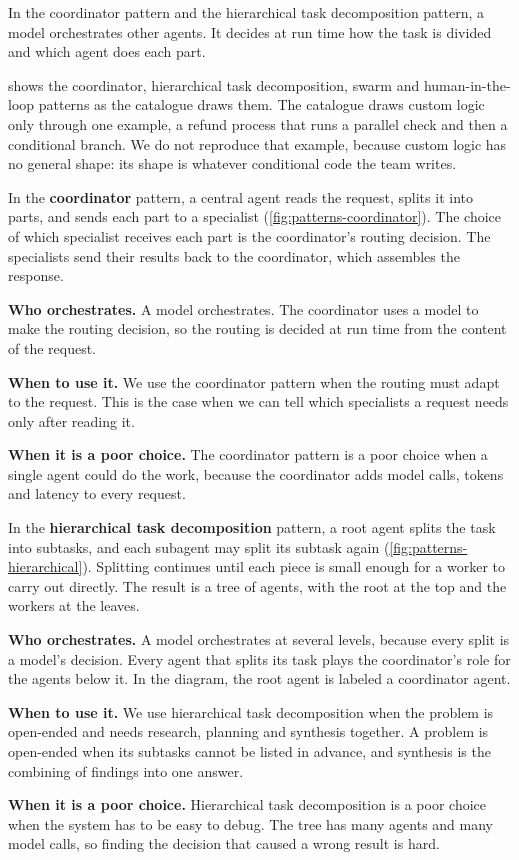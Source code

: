 In the coordinator pattern and the hierarchical task decomposition pattern, a model orchestrates
other agents. It decides at run time how the task is divided and which agent does each part.

 shows the coordinator, hierarchical task decomposition,
swarm and human-in-the-loop patterns as the catalogue draws them. The catalogue draws custom logic
only through one example, a refund process that runs a parallel check and then a conditional
branch. We do not reproduce that example, because custom logic has no general shape: its shape is
whatever conditional code the team writes.

In the \textbf{coordinator} pattern, a central agent reads the request, splits it into parts, and
sends each part to a specialist (\cref{fig:patterns-coordinator}). The choice of which specialist
receives each part is the coordinator's routing decision. The specialists send their results back
to the coordinator, which assembles the response.
\bi
\item \textbf{Who orchestrates.} A model orchestrates. The coordinator uses a model to make the
routing decision, so the routing is decided at run time from the content of the request.
\item \textbf{When to use it.} We use the coordinator pattern when the routing must adapt to the
request. This is the case when we can tell which specialists a request needs only after reading it.
\item \textbf{When it is a poor choice.} The coordinator pattern is a poor choice when a single agent
could do the work, because the coordinator adds model calls, tokens and latency to every request.
\ei

In the \textbf{hierarchical task decomposition} pattern, a root agent splits the task into
subtasks, and each subagent may split its subtask again (\cref{fig:patterns-hierarchical}).
Splitting continues until each piece is small enough for a worker to carry out directly. The result
is a tree of agents, with the root at the top and the workers at the leaves.
\bi
\item \textbf{Who orchestrates.} A model orchestrates at several levels, because every split is a
model's decision. Every agent that splits its task plays the coordinator's role for the agents
below it. In the diagram, the root agent is labeled a coordinator agent.
\item \textbf{When to use it.} We use hierarchical task decomposition when the problem is
open-ended and needs research, planning and synthesis together. A problem is open-ended when its
subtasks cannot be listed in advance, and synthesis is the combining of findings into one answer.
\item \textbf{When it is a poor choice.} Hierarchical task decomposition is a poor choice when the
system has to be easy to debug. The tree has many agents and many model calls, so finding the
decision that caused a wrong result is hard.
\ei

